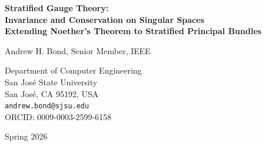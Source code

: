 \documentclass[11pt,a4paper]{article}
\begin{document}
\begin{titlepage}
\centering
\vspace*{2cm}

{\LARGE\bfseries Stratified Gauge Theory:\\Invariance and Conservation on Singular Spaces\\[0.5em]
\large Extending Noether's Theorem to Stratified Principal Bundles}

\vspace{1.5cm}

{\Large Andrew H. Bond, Senior Member, IEEE}

\vspace{0.5cm}

{\large
Department of Computer Engineering\\
San Jos\'e State University\\
San Jos\'e, CA 95192, USA\\[0.3cm]
\texttt{andrew.bond@sjsu.edu}\\[0.3cm]
ORCID: 0009-0003-2599-6158
}

\vspace{1cm}

{\large Spring 2026}

\vspace{2cm}

\begin{abstract}
We develop a gauge-theoretic framework compatible with stratified spaces, resolving the
tension between (1) the smooth manifold structure required by standard Noether conservation and (2) the stratified structure required for moral discontinuities, hard constraints,
and regime changes. The key insight is that gauge structure and Noether conservation hold
\textit{stratum-wise}, while boundary behavior is governed by \textit{matching conditions} that constrain
how trajectories cross between strata. We define stratified principal bundles, stratified
connections, and prove a \textbf{Stratified Noether Theorem}: the alignment current is conserved within each stratum and satisfies explicit jump conditions at stratum boundaries.
For the special case of constraint boundaries (where evaluation jumps to $-\infty$), we prove
that admissible trajectories cannot cross the boundary, recovering the No Escape result as a
consequence of the variational principle rather than an additional assumption. The framework unifies Stratified Geometric Ethics with gauge-theoretic invariance while maintaining
mathematical rigor.
\end{abstract}


\end{titlepage}
\end{document}
